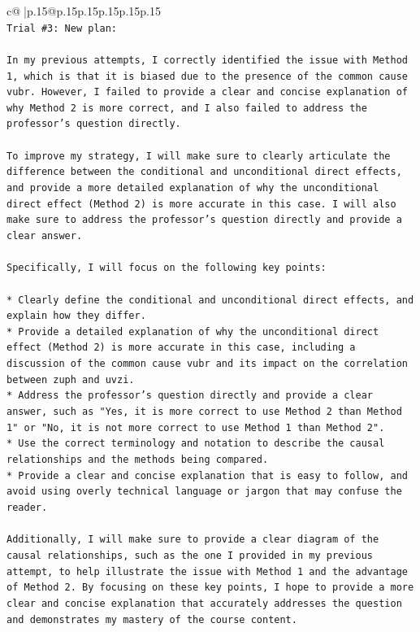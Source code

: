 \documentclass{article}
\begin{document}
{\begin{supertabular}{c@{$\;$}|p{.15\linewidth}@{}p{.15\linewidth}p{.15\linewidth}p{.15\linewidth}p{.15\linewidth}p{.15\linewidth}}
{{{\\ 
\texttt{Trial \#3: New plan: } \\
\\ 
\texttt{In my previous attempts, I correctly identified the issue with Method 1, which is that it is biased due to the presence of the common cause vubr. However, I failed to provide a clear and concise explanation of why Method 2 is more correct, and I also failed to address the professor's question directly.} \\
\\ 
\texttt{To improve my strategy, I will make sure to clearly articulate the difference between the conditional and unconditional direct effects, and provide a more detailed explanation of why the unconditional direct effect (Method 2) is more accurate in this case. I will also make sure to address the professor's question directly and provide a clear answer.} \\
\\ 
\texttt{Specifically, I will focus on the following key points:} \\
\\ 
\texttt{* Clearly define the conditional and unconditional direct effects, and explain how they differ.} \\
\texttt{* Provide a detailed explanation of why the unconditional direct effect (Method 2) is more accurate in this case, including a discussion of the common cause vubr and its impact on the correlation between zuph and uvzi.} \\
\texttt{* Address the professor's question directly and provide a clear answer, such as "Yes, it is more correct to use Method 2 than Method 1" or "No, it is not more correct to use Method 1 than Method 2".} \\
\texttt{* Use the correct terminology and notation to describe the causal relationships and the methods being compared.} \\
\texttt{* Provide a clear and concise explanation that is easy to follow, and avoid using overly technical language or jargon that may confuse the reader.} \\
\\ 
\texttt{Additionally, I will make sure to provide a clear diagram of the causal relationships, such as the one I provided in my previous attempt, to help illustrate the issue with Method 1 and the advantage of Method 2. By focusing on these key points, I hope to provide a more clear and concise explanation that accurately addresses the question and demonstrates my mastery of the course content.} \\
}}}
\end{supertabular}}
\end{document}
